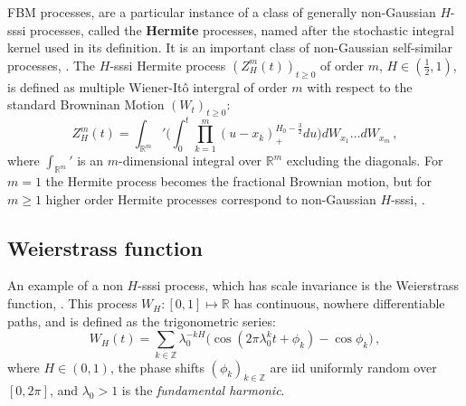 \documentclass[a4paper]{article}
\newcommand{\Real}{\mathbb{R}}
\begin{document}
FBM processes, are a particular instance of a class of generally non-Gaussian $H$-sssi
processes, called the \textbf{Hermite} processes, named after the stochastic integral
kernel used in its definition. It is an important class of non-Gaussian self-similar
processes, \cite{maejima2007}. The $H$-sssi Hermite process $(Z_H^m(t))_{t\geq 0}$
of order $m$, $H \in (\frac{1}{2}, 1)$, is defined as multiple Wiener-It\^o intergral
of order $m$ with respect to the standard Browninan Motion $(W_t)_{t\geq0}$:
\begin{equation}\label{eq:def_hermite}
    Z_H^m(t) = \int_{\Real^m}' \Biggl(
            \int_0^t \prod_{k=1}^m (u - x_k)_+^{H_0-\frac{3}{2}} du
        \Biggr) dW_{x_1} \ldots dW_{x_m}\,,
\end{equation}
where $\int_{\Real^m}'$ is an $m$-dimensional integral over $\Real^m$ excluding the
diagonals. For $m=1$ the Hermite process becomes the fractional Brownian motion,
but for $m\geq 1$ higher order Hermite processes correspond to non-Gaussian $H$-sssi,
\cite{Bai20141710,Chronopoulou:1114288,embrechts2000introduction}.


\subsection{Weierstrass function} %
\label{sub:weierstrass_function}

An example of a non $H$-sssi process, which has scale invariance is the Weierstrass
function, \cite{decrouez2013}. This process $W_H:[0,1] \mapsto \Real$ has continuous,
nowhere differentiable paths, and is defined as the trigonometric series:
\begin{equation} \label{eq:def_weir}
    W_H(t) = \sum_{k\in \mathbb{Z}} \lambda_0^{-k H} \bigl(
            \cos(2\pi \lambda_0^k t + \phi_k) - \cos \phi_k
        \bigr) \,,
\end{equation}
where $H\in(0, 1)$, the phase shifts $(\phi_k)_{k\in\mathbb{Z}}$ are iid uniformly
random over $[0, 2\pi]$, and $\lambda_0 > 1$ is the \emph{fundamental harmonic}.
\end{document}
